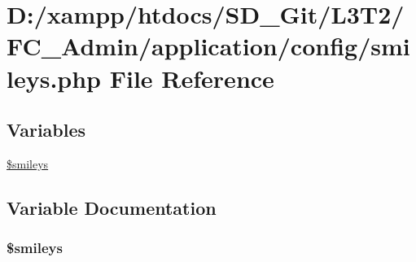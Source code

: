 \hypertarget{_admin_2application_2config_2smileys_8php}{}\section{D\+:/xampp/htdocs/\+S\+D\+\_\+\+Git/\+L3\+T2/\+F\+C\+\_\+\+Admin/application/config/smileys.php File Reference}
\label{_admin_2application_2config_2smileys_8php}
\subsection*{Variables}
\begin{DoxyCompactItemize}
\item 
\hyperlink{_admin_2application_2config_2smileys_8php_a3f21d1c0fb54cb2010e7c7004f29f74c}{\$smileys}
\end{DoxyCompactItemize}


\subsection{Variable Documentation}
\hypertarget{_admin_2application_2config_2smileys_8php_a3f21d1c0fb54cb2010e7c7004f29f74c}{}
\subsubsection[{\$smileys}]{\setlength{\rightskip}{0pt plus 5cm}\$smileys}\label{_admin_2application_2config_2smileys_8php_a3f21d1c0fb54cb2010e7c7004f29f74c}
